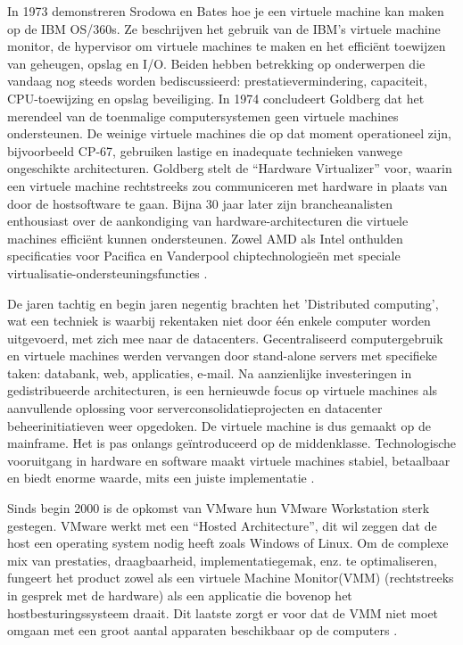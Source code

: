 In 1973 demonstreren Srodowa en Bates hoe je een virtuele machine kan maken op de IBM OS/360s. Ze beschrijven het gebruik van de IBM's virtuele machine monitor, de hypervisor om virtuele machines te maken en het efficiënt toewijzen van geheugen, opslag en I/O. Beiden hebben betrekking op onderwerpen die vandaag nog steeds worden bediscussieerd: prestatievermindering, capaciteit, CPU-toewijzing en opslag beveiliging. In 1974 concludeert Goldberg dat het merendeel van de toenmalige computersystemen geen virtuele machines ondersteunen. De weinige virtuele machines die op dat moment operationeel zijn, bijvoorbeeld CP-67, gebruiken lastige en inadequate technieken vanwege ongeschikte architecturen. Goldberg stelt de “Hardware Virtualizer” voor, waarin een virtuele machine rechtstreeks zou communiceren met hardware in plaats van door de hostsoftware te gaan. Bijna 30 jaar later zijn brancheanalisten enthousiast over de aankondiging van hardware-architecturen die virtuele machines efficiënt kunnen ondersteunen. Zowel AMD als Intel onthulden specificaties voor Pacifica en Vanderpool chiptechnologieën met speciale virtualisatie-ondersteuningsfuncties \autocite{Radhwan2013}.

De jaren tachtig en begin jaren negentig brachten het 'Distributed computing', wat een techniek is waarbij rekentaken niet door één enkele computer worden uitgevoerd,  met zich mee naar de datacenters. Gecentraliseerd computergebruik en virtuele machines werden vervangen door stand-alone servers met specifieke taken: databank, web, applicaties, e-mail. Na aanzienlijke investeringen in gedistribueerde architecturen, is een hernieuwde focus op virtuele machines als aanvullende oplossing voor serverconsolidatieprojecten en datacenter beheerinitiatieven weer opgedoken. De virtuele machine is dus gemaakt op de mainframe. Het is pas onlangs geïntroduceerd op de middenklasse. Technologische vooruitgang in hardware en software maakt virtuele machines stabiel, betaalbaar en biedt enorme waarde, mits een juiste implementatie \autocite{Jeff2009}.

Sinds begin 2000 is de opkomst van VMware hun VMware Workstation sterk gestegen. VMware werkt met een “Hosted Architecture”, dit wil zeggen dat de host een operating system nodig heeft zoals Windows of Linux. Om de complexe mix van prestaties, draagbaarheid, implementatiegemak, enz. te optimaliseren, fungeert het product zowel als een virtuele Machine Monitor(VMM) (rechtstreeks in gesprek met de hardware) als  een applicatie die bovenop het hostbesturingssysteem draait. Dit laatste zorgt er voor dat de VMM niet moet omgaan met een groot aantal apparaten beschikbaar op de computers \autocite{Singh2004}.

